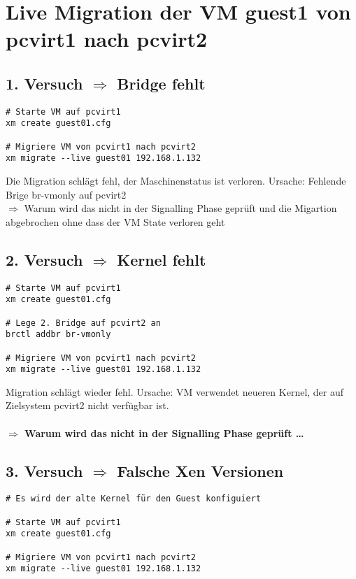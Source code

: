 \section{Live Migration der VM guest1 von pcvirt1 nach pcvirt2}

\subsection{1. Versuch $\Rightarrow$ Bridge fehlt}
\setupVerbatimOut
\begin{verbatim}
# Starte VM auf pcvirt1
xm create guest01.cfg

# Migriere VM von pcvirt1 nach pcvirt2
xm migrate --live guest01 192.168.1.132
\end{verbatim}

Die Migration schlägt fehl, der Maschinenstatus ist verloren. Ursache: Fehlende Brige br-vmonly auf pcvirt2
\\
$\Rightarrow$ Warum wird das nicht in der Signalling Phase geprüft und die Migartion abgebrochen ohne dass der VM State verloren geht

\subsection {2. Versuch $\Rightarrow$ Kernel fehlt}
\setupVerbatimOut
\begin{verbatim}
# Starte VM auf pcvirt1
xm create guest01.cfg

# Lege 2. Bridge auf pcvirt2 an
brctl addbr br-vmonly

# Migriere VM von pcvirt1 nach pcvirt2
xm migrate --live guest01 192.168.1.132
\end{verbatim}

Migration schlägt wieder fehl. Ursache: VM verwendet neueren Kernel, der auf Zielsystem pcvirt2 nicht verfügbar ist.
\\
\\
\large
\textbf{$\Rightarrow$ Warum wird das nicht in der Signalling Phase geprüft  \dots}
\normalsize

\subsection {3. Versuch $\Rightarrow$ Falsche Xen Versionen}
\setupVerbatimOut
\begin{verbatim}
# Es wird der alte Kernel für den Guest konfiguiert

# Starte VM auf pcvirt1
xm create guest01.cfg

# Migriere VM von pcvirt1 nach pcvirt2
xm migrate --live guest01 192.168.1.132
\end{verbatim}

